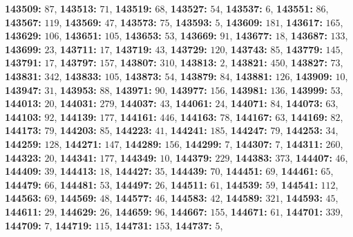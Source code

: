 \textsf{\bfseries 143509:} $87$, \textsf{\bfseries 143513:} $71$, \textsf{\bfseries 143519:} $68$, \textsf{\bfseries 143527:} $54$, \textsf{\bfseries 143537:} $6$, \textsf{\bfseries 143551:} $86$, \textsf{\bfseries 143567:} $119$, \textsf{\bfseries 143569:} $47$, \textsf{\bfseries 143573:} $75$, \textsf{\bfseries 143593:} $5$, \textsf{\bfseries 143609:} $181$, \textsf{\bfseries 143617:} $165$, \textsf{\bfseries 143629:} $106$, \textsf{\bfseries 143651:} $105$, \textsf{\bfseries 143653:} $53$, \textsf{\bfseries 143669:} $91$, \textsf{\bfseries 143677:} $18$, \textsf{\bfseries 143687:} $133$, \textsf{\bfseries 143699:} $23$, \textsf{\bfseries 143711:} $17$, \textsf{\bfseries 143719:} $43$, \textsf{\bfseries 143729:} $120$, \textsf{\bfseries 143743:} $85$, \textsf{\bfseries 143779:} $145$, \textsf{\bfseries 143791:} $17$, \textsf{\bfseries 143797:} $157$, \textsf{\bfseries 143807:} $310$, \textsf{\bfseries 143813:} $2$, \textsf{\bfseries 143821:} $450$, \textsf{\bfseries 143827:} $73$, \textsf{\bfseries 143831:} $342$, \textsf{\bfseries 143833:} $105$, \textsf{\bfseries 143873:} $54$, \textsf{\bfseries 143879:} $84$, \textsf{\bfseries 143881:} $126$, \textsf{\bfseries 143909:} $10$, \textsf{\bfseries 143947:} $31$, \textsf{\bfseries 143953:} $88$, \textsf{\bfseries 143971:} $90$, \textsf{\bfseries 143977:} $156$, \textsf{\bfseries 143981:} $136$, \textsf{\bfseries 143999:} $53$, \textsf{\bfseries 144013:} $20$, \textsf{\bfseries 144031:} $279$, \textsf{\bfseries 144037:} $43$, \textsf{\bfseries 144061:} $24$, \textsf{\bfseries 144071:} $84$, \textsf{\bfseries 144073:} $63$, \textsf{\bfseries 144103:} $92$, \textsf{\bfseries 144139:} $177$, \textsf{\bfseries 144161:} $446$, \textsf{\bfseries 144163:} $78$, \textsf{\bfseries 144167:} $63$, \textsf{\bfseries 144169:} $82$, \textsf{\bfseries 144173:} $79$, \textsf{\bfseries 144203:} $85$, \textsf{\bfseries 144223:} $41$, \textsf{\bfseries 144241:} $185$, \textsf{\bfseries 144247:} $79$, \textsf{\bfseries 144253:} $34$, \textsf{\bfseries 144259:} $128$, \textsf{\bfseries 144271:} $147$, \textsf{\bfseries 144289:} $156$, \textsf{\bfseries 144299:} $7$, \textsf{\bfseries 144307:} $7$, \textsf{\bfseries 144311:} $260$, \textsf{\bfseries 144323:} $20$, \textsf{\bfseries 144341:} $177$, \textsf{\bfseries 144349:} $10$, \textsf{\bfseries 144379:} $229$, \textsf{\bfseries 144383:} $373$, \textsf{\bfseries 144407:} $46$, \textsf{\bfseries 144409:} $39$, \textsf{\bfseries 144413:} $18$, \textsf{\bfseries 144427:} $35$, \textsf{\bfseries 144439:} $70$, \textsf{\bfseries 144451:} $69$, \textsf{\bfseries 144461:} $65$, \textsf{\bfseries 144479:} $66$, \textsf{\bfseries 144481:} $53$, \textsf{\bfseries 144497:} $26$, \textsf{\bfseries 144511:} $61$, \textsf{\bfseries 144539:} $59$, \textsf{\bfseries 144541:} $112$, \textsf{\bfseries 144563:} $69$, \textsf{\bfseries 144569:} $48$, \textsf{\bfseries 144577:} $46$, \textsf{\bfseries 144583:} $42$, \textsf{\bfseries 144589:} $321$, \textsf{\bfseries 144593:} $45$, \textsf{\bfseries 144611:} $29$, \textsf{\bfseries 144629:} $26$, \textsf{\bfseries 144659:} $96$, \textsf{\bfseries 144667:} $155$, \textsf{\bfseries 144671:} $61$, \textsf{\bfseries 144701:} $339$, \textsf{\bfseries 144709:} $7$, \textsf{\bfseries 144719:} $115$, \textsf{\bfseries 144731:} $153$, \textsf{\bfseries 144737:} $5$, 
